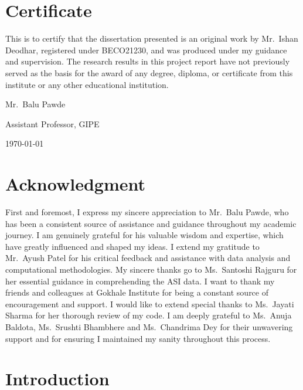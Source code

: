 \documentclass [12pt]{article}
\begin{document}
\newpage
\section*{Certificate}

\normalsize
This is to certify that the dissertation presented is an original work by Mr.\ Ishan Deodhar, registered under BECO21230, and was produced under my guidance and supervision. The research results in this project report have not previously served as the basis for the award of any degree, diploma, or certificate from this institute or any other educational institution.
\vspace{16cm}

Mr.\ Balu Pawde

Assistant Professor, GIPE

\today

\newpage
\section*{Acknowledgment}

\normalsize
First and foremost, I express my sincere appreciation to Mr.\ Balu Pawde, who has been a consistent source of assistance and guidance throughout my academic journey. I am genuinely grateful for his valuable wisdom and expertise, which have greatly influenced and shaped my ideas. I extend my gratitude to Mr.\ Ayush Patel for his critical feedback and assistance with data analysis and computational methodologies. My sincere thanks go to Ms.\ Santoshi Rajguru for her essential guidance in comprehending the ASI data. I want to thank my friends and colleagues at Gokhale Institute for being a constant source of encouragement and support. I would like to extend special thanks to Ms.\ Jayati Sharma for her thorough review of my code. I am deeply grateful to Ms.\ Anuja Baldota, Ms.\ Srushti Bhambhere and Ms.\ Chandrima Dey for their unwavering support and for ensuring I maintained my sanity throughout this process.

\newpage

\tableofcontents
\newpage

\section{Introduction}
\end{document}
